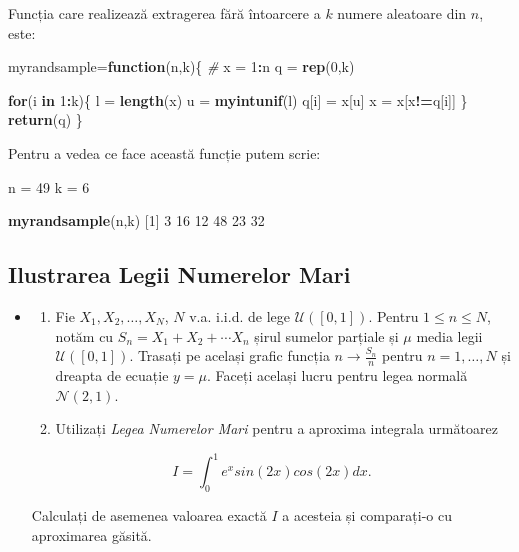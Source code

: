 \documentclass[]{article}
\newenvironment{Shaded}{\begin{snugshade}}{\end{snugshade}}
\newcommand{\KeywordTok}[1]{\textcolor[rgb]{0.13,0.29,0.53}{\textbf{#1}}}
\newcommand{\DecValTok}[1]{\textcolor[rgb]{0.00,0.00,0.81}{#1}}
\newcommand{\StringTok}[1]{\textcolor[rgb]{0.31,0.60,0.02}{#1}}
\newcommand{\CommentTok}[1]{\textcolor[rgb]{0.56,0.35,0.01}{\textit{#1}}}
\newcommand{\ControlFlowTok}[1]{\textcolor[rgb]{0.13,0.29,0.53}{\textbf{#1}}}
\newcommand{\OperatorTok}[1]{\textcolor[rgb]{0.81,0.36,0.00}{\textbf{#1}}}
\newcommand{\NormalTok}[1]{#1}
\newenvironment{frshaded*}{%
  \def\FrameCommand{\fboxrule=\FrameRule\fboxsep=\FrameSep \fcolorbox{framecolor}{shadecolor1}}%
  \MakeFramed {\advance\hsize-\width \FrameRestore}}%
{\endMakeFramed}
\newenvironment{rmdblock}[1]
  {\begin{frshaded*}
  \begin{itemize}
  \renewcommand{\labelitemi}{
    \raisebox{-.7\height}[0pt][0pt]{
      {\setkeys{Gin}{width=2em,keepaspectratio}\texttt{[image: images/icons/\#1]}}
    }
  }
  \item
  }
  {
  \end{itemize}
  \end{frshaded*}
  }
\newenvironment{rmdexercise}
  {\begin{rmdblock}{exercise}}
  {\end{rmdblock}}
\begin{document}
Funcția care realizează extragerea fără întoarcere a \(k\) numere
aleatoare din \(n\), este:

\begin{Shaded}
\begin{Highlighting}[]
\NormalTok{myrandsample=}\ControlFlowTok{function}\NormalTok{(n,k)\{}
  \CommentTok{# }
\NormalTok{  x =}\StringTok{ }\DecValTok{1}\OperatorTok{:}\NormalTok{n}
\NormalTok{  q =}\StringTok{ }\KeywordTok{rep}\NormalTok{(}\DecValTok{0}\NormalTok{,k)}
  
  \ControlFlowTok{for}\NormalTok{(i }\ControlFlowTok{in} \DecValTok{1}\OperatorTok{:}\NormalTok{k)\{}
\NormalTok{    l =}\StringTok{ }\KeywordTok{length}\NormalTok{(x)}
\NormalTok{    u =}\StringTok{ }\KeywordTok{myintunif}\NormalTok{(l)}
\NormalTok{    q[i] =}\StringTok{ }\NormalTok{x[u]}
\NormalTok{    x =}\StringTok{ }\NormalTok{x[x}\OperatorTok{!=}\NormalTok{q[i]]}
\NormalTok{  \}}
  \KeywordTok{return}\NormalTok{(q)}
\NormalTok{\}}
\end{Highlighting}
\end{Shaded}

Pentru a vedea ce face această funcție putem scrie:

\begin{Shaded}
\begin{Highlighting}[]
\NormalTok{n =}\StringTok{ }\DecValTok{49}
\NormalTok{k =}\StringTok{ }\DecValTok{6}

\KeywordTok{myrandsample}\NormalTok{(n,k)}
\NormalTok{[}\DecValTok{1}\NormalTok{]  }\DecValTok{3} \DecValTok{16} \DecValTok{12} \DecValTok{48} \DecValTok{23} \DecValTok{32}
\end{Highlighting}
\end{Shaded}

\subsection{Ilustrarea Legii Numerelor
Mari}\label{ilustrarea-legii-numerelor-mari}

\begin{rmdexercise}
\begin{enumerate}
\def\labelenumi{\alph{enumi})}
\item
  Fie \(X_1,X_2,\dots,X_N\), \(N\) v.a. i.i.d. de lege
  \(\mathcal{U}([0,1])\). Pentru \(1\leq n\leq N\), notăm cu
  \(S_n=X_1+X_2+\cdots X_n\) șirul sumelor parțiale și \(\mu\) media
  legii \(\mathcal{U}([0,1])\). Trasați pe același grafic funcția
  \(n\to \frac{S_n}{n}\) pentru \(n=1,\dots,N\) și dreapta de ecuație
  \(y=\mu\). Faceți același lucru pentru legea normală
  \(\mathcal{N}(2,1)\).
\item
  Utilizați \emph{Legea Numerelor Mari} pentru a aproxima integrala
  următoarez
\end{enumerate}

\[I = \int_{0}^{1}e^{x}sin(2x)cos(2x)dx.\]

Calculați de asemenea valoarea exactă \(I\) a acesteia și comparați-o cu
aproximarea găsită.
\end{rmdexercise}
\end{document}
